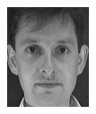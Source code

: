 \begin{frame}
\begin{columns}
\begin{overlayarea}{\textwidth}{\textheight}
\begin{minipage}[t]{0.15\textwidth}
      \end{minipage}
      \begin{minipage}[t]{0.15\textwidth}
        \includegraphics[width=\textwidth]{images/celebrity_images/s24_1.jpg}
      \end{minipage}


\end{overlayarea}
\end{columns}
\end{frame}
